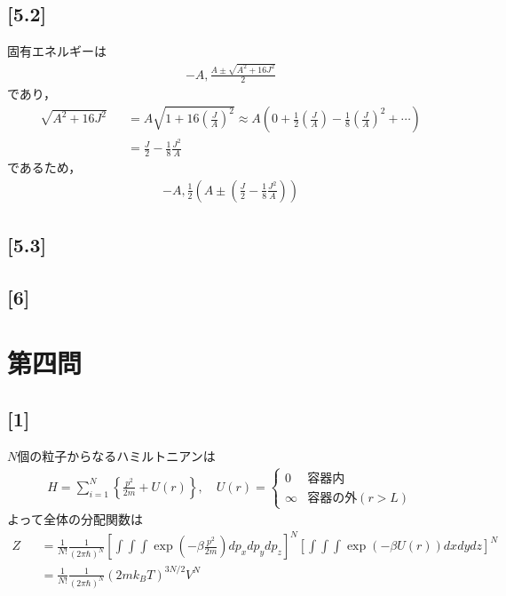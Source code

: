 \documentclass[12pt,dvipdfmx]{jsarticle}
\begin{document}
\subsection*{\large{[5.2]}}
固有エネルギーは
\begin{eqnarray}
  -A,\frac{A\pm \sqrt{A^2+16J^2}}{2} 
\end{eqnarray}
であり，
\begin{eqnarray}
  \sqrt{A^2+16J^2} &&= A\sqrt{ 1+16\left( \frac{J}{A} \right)^2 } \approx A\left( 0 + \frac{1}{2}\left( \frac{J}{A} \right) -\frac{1}{8}\left( \frac{J}{A} \right)^2+ \cdots \right)\\
  &&= \frac{J}{2}-\frac{1}{8}\frac{J^2}{A}
\end{eqnarray}
であるため，
\begin{eqnarray}
  -A, \frac{1}{2}\left( A\pm \left( \frac{J}{2}-\frac{1}{8}\frac{J^2}{A} \right) \right)
\end{eqnarray}
\subsection*{\large{[5.3]}}
\subsection*{\large{[6]}}
\newpage
\section*{\Large{第四問}}
\subsection*{\large{[1]}}

$N$個の粒子からなるハミルトニアンは
\begin{eqnarray}
  H = \sum_{i=1}^{N} \left\{ \frac{p^2}{2m} + U(r) \right\}, \quad U(r)=
  \begin{cases}
    0 & 容器内\\
    \infty & 容器の外(r>L)
  \end{cases}
\end{eqnarray}
よって全体の分配関数は
\begin{eqnarray}
  Z &&= \frac{1}{N!}\frac{1}{(2\pi\hbar)^N}\left[ \int\int\int \exp\left(-\beta\frac{p^2}{2m}\right)dp_x dp_y dp_z \right]^N \left[ \int\int\int \exp\left(-\beta U(r)\right)dx dydz \right]^N\\
  &&= \frac{1}{N!}\frac{1}{(2\pi\hbar)^N} (2mk_B T)^{3N/2} V^N
\end{eqnarray}
\end{document}
